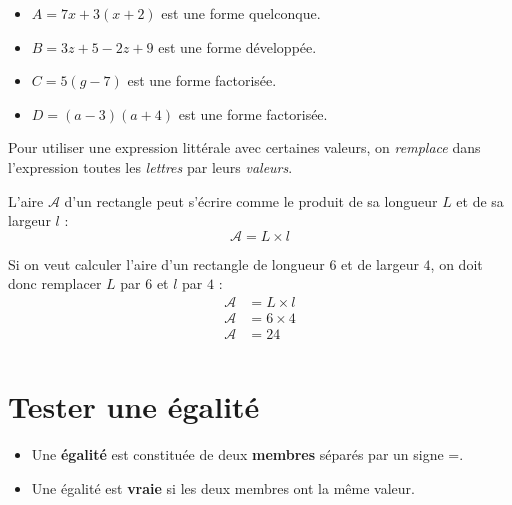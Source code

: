 \documentclass[../€Cours-complet/Cours-complet]{subfiles}
\begin{document}
\begin{exemple}
	\begin{itemize}
		\item $A = 7x + 3(x+2)$ est une forme quelconque.
		\item $B = 3z + 5 - 2z + 9$ est une forme développée.
		\item $C = 5(g - 7)$ est une forme factorisée.
		\item $D = (a - 3) (a + 4)$ est une forme factorisée.
	\end{itemize}
\end{exemple}

\begin{cours}
	Pour utiliser une expression littérale avec certaines valeurs, on \textit{remplace} dans l'expression toutes les \textit{lettres} par leurs \textit{valeurs}.
\end{cours}

\begin{exemple}
	L'aire $𝒜$ d'un rectangle peut s'écrire comme le produit de sa longueur $L$ et de sa largeur $𝑙$ :
	$$ 𝒜 = L × 𝑙 $$

	Si on veut calculer l'aire d'un rectangle de longueur $6$ et de largeur $4$, on doit donc remplacer $L$ par $6$ et $𝑙$ par $4$ :
	\begin{align*}
		𝒜 & = L × 𝑙 \\
		𝒜 & = 6 × 4 \\
		𝒜 & = 24    \\
	\end{align*}
\end{exemple}

\section{Tester une égalité}

\begin{cours}[Égalité]
	\begin{itemize}
		\item Une \textbf{égalité} est constituée de deux \textbf{membres} séparés par un signe =.
		\item Une égalité est \textbf{vraie} si les deux membres ont la même valeur.
	\end{itemize}
\end{cours}
\end{document}
